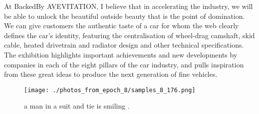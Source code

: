 \documentclass{article}%
\begin{document}
At BackedBy AVEVITATION, I believe that in accelerating the industry, we will be able to unlock the beautiful outside beauty that is the point of domination. We can give customers the authentic taste of a car for whom the web clearly defines the car's identity, featuring the centralisation of wheel{-}drag camshaft, skid cable, heated drivetrain and radiator design and other technical specifications.\newline%
The exhibition highlights important achievements and new developments by companies in each of the eight pillars of the car industry, and pulls inspiration from these great ideas to produce the next generation of fine vehicles.\newline%

%


\begin{figure}[h!]%
\centering%
\texttt{[image: ./photos\_from\_epoch\_8/samples\_8\_176.png]}%
\caption{a man in a suit and tie is smiling .}%
\end{figure}

%
\end{document}
